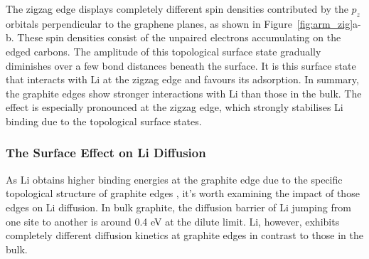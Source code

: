 \documentclass[../main.tex]{subfiles}
\begin{document}
The zigzag edge displays completely different spin densities contributed by the $p_z$ orbitals perpendicular to the graphene planes, as shown in Figure~\ref{fig:arm_zig}a-b. \cite{leggesse2016lithium,fujita1996peculiar,lee2005magnetic,peng2020lithium} These spin densities consist of the unpaired electrons accumulating on the edged carbons. The amplitude of this topological surface state gradually diminishes over a few bond distances beneath the surface. It is this surface state that interacts with Li at the zigzag edge and favours its adsorption. In summary, the graphite edges show stronger interactions with Li than those in the bulk. The effect is especially pronounced at the zigzag edge, which strongly stabilises Li binding due to the topological surface states.
    
\subsubsection{The Surface Effect on Li Diffusion}
As Li obtains higher binding energies at the graphite edge due to the specific topological structure of graphite edges \cite{leggesse2016lithium,peng2020lithium}, it's worth examining the impact of those edges on Li diffusion. In bulk graphite, the diffusion barrier of Li jumping from one site to another is around 0.4 eV at the dilute limit.\cite{thinius2014theoretical} Li, however, exhibits completely different diffusion kinetics at graphite edges in contrast to those in the bulk.\cite{leggesse2016lithium,peng2020lithium} 
\end{document}
